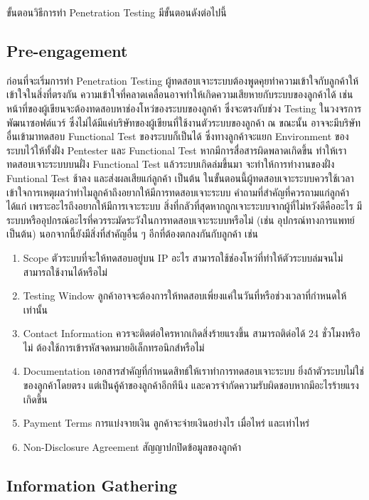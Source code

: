 ขั้นตอนวิธีการทำ Penetration Testing มีขั้นตอนดังต่อไปนี้

\subsection{Pre-engagement}

ก่อนที่จะเริ่มการทำ Penetration Testing ผู้ทดสอบเจาะระบบต้องพูดคุยทำความเข้าใจกับลูกค้าให้เข้าใจในสิ่งที่ตรงกัน ความเข้าใจที่คลาดเคลื่อนอาจทำให้เกิดความเสียหายกับระบบของลูกค้าได้ เช่น หน้าที่ของผู้เขียนจะต้องทดสอบหาช่องโหว่ของระบบของลูกค้า ซึ่งจะตรงกับช่วง Testing ในวงจรการพัฒนาซอฟต์แวร์ ซึ่งไม่ได้มีแค่บริษัทของผู้เขียนที่ใช้งานตัวระบบของลูกค้า ณ ขณะนั้น อาจจะมีบริษัทอื่นเข้ามาทดสอบ Functional Test ของระบบก็เป็นได้ ซึ่งทางลูกค้าจะแยก Environment ของระบบไว้ให้ทั้งฝั่ง Pentester และ Functional Test หากมีการสื่อสารผิดพลาดเกิดขึ้น ทำให้เราทดสอบเจาะระบบบนฝั่ง Functional Test แล้วระบบเกิดล่มขึ้นมา จะทำให้การทำงานของฝั่ง Funtional Test ช้าลง และส่งผลเสียแก่ลูกค้า เป็นต้น
ในขั้นตอนนี้ผู้ทดสอบเจาะระบบควรใช้เวลาเข้าใจการเหตุผลว่าทำไมลูกค้าถึงอยากให้มีการทดสอบเจาะระบบ คำถามที่สำคัญที่ควรถามแก่ลูกค้าได้แก่ เพราะอะไรถึงอยากให้มีการเจาะระบบ สิ่งที่กลัวที่สุดหากถูกเจาะระบบจากผู้ที่ไม่หวังดีคืออะไร มีระบบหรืออุปกรณ์อะไรที่ควรระมัดระวังในการทดสอบเจาะระบบหรือไม่ (เช่น อุปกรณ์ทางการแพทย์ เป็นต้น)
นอกจากนี้ยังมีสิ่งที่สำคัญอื่น ๆ อีกที่ต้องตกลงกันกับลูกค้า เช่น

\begin{enumerate}
	\item Scope ตัวระบบที่จะให้ทดสอบอยู่บน IP อะไร สามารถใช้ช่องโหว่ที่ทำให้ตัวระบบล่มจนไม่สามารถใช้งานได้หรือไม่ 
	\item Testing Window ลูกค้าอาจจะต้องการให้ทดสอบเพี่ยงแค่ในวันที่หรือช่วงเวลาที่กำหนดให้เท่านั้น
	\item Contact Information ควรจะติดต่อใครหากเกิดสิ่งร้ายแรงขึ้น สามารถติด่อได้ 24 ชั่วโมงหรือไม่ ต้องใช้การเข้ารหัสจดหมายอิเล็กทรอนิกส์หรือไม่
	\item Documentation เอกสารสำคัญที่กำหนดสิทธ์ให้เราทำการทดสอบเจาะระบบ ยิ่งถ้าตัวระบบไม่ใช่ของลูกค้าโดยตรง แต่เป็นคู้ค้าของลูกค้าอีกทีนึง และควรจำกัดความรับผิดชอบหากมีอะไรร้ายแรงเกิดขึ้น
	\item Payment Terms การแบ่งจายเงิน ลูกค้าจะจ่ายเงินอย่างไร เมื่อไหร่ และเท่าไหร่
	\item Non-Disclosure Agreement สัญญาปกปิดข้อมูลของลูกค้า
\end{enumerate}

\subsection{Information Gathering}

